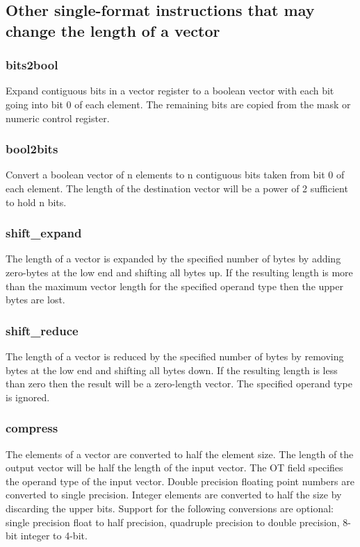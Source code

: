 \documentclass[forwardcom.tex]{subfiles}
\begin{document}
\subsection{Other single-format instructions that may change the length of a vector}

\subsubsection{bits2bool}
Expand contiguous bits in a vector register to a boolean vector with each bit going into bit 0 of each element. The remaining bits are copied from the mask or numeric control register.

\subsubsection{bool2bits}
Convert a boolean vector of n elements to n contiguous bits taken from bit 0 of each element. The length of the destination vector will be a power of 2 sufficient to hold n bits.

\subsubsection{shift\_expand}
The length of a vector is expanded by the specified number of bytes by adding zero-bytes at the low end and shifting all bytes up. If the resulting length is more than the maximum vector length for the specified operand type then the upper bytes are lost.

\subsubsection{shift\_reduce}
The length of a vector is reduced by the specified number of bytes by removing bytes at the low end and shifting all bytes down. If the resulting length is less than zero then the result will be a zero-length vector. The specified operand type is ignored.

\subsubsection{compress}
The elements of a vector are converted to half the element size. The length of the output vector will be half the length of the input vector. The OT field specifies the operand type of the input vector. Double precision floating point numbers are converted to single precision. Integer elements are converted to half the size by discarding the upper bits. Support for the following conversions are optional: single precision float to half precision, quadruple precision to double precision, 8-bit integer to 4-bit.
\vspace{2mm}
\end{document}
